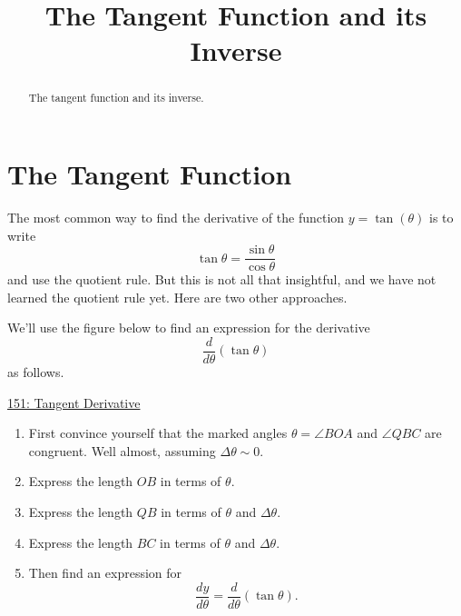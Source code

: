 \documentclass{ximera}
\title{The Tangent Function and its Inverse}
\begin{document}
\begin{abstract}
The tangent function and its inverse.
\end{abstract}
\maketitle


\section{The Tangent Function}

The most common way to find the derivative of the function $y=\tan(\theta)$ is to write 
\[
  \tan\theta = \frac{\sin\theta}{\cos \theta}
\]
and use the quotient rule. But this is not all that insightful, and we have not learned the quotient rule yet. Here are two other approaches.

\begin{question}  \label{QPDeredsRMNFR}

We'll use the figure below to find an expression for the derivative
\[
   \frac{d}{d\theta} \left( \tan\theta \right)
\]
as follows.

\begin{onlineOnly}
   \begin{center}
\end{center}
\end{onlineOnly}

\href{https://www.desmos.com/calculator/10538a93e8}{151: Tangent Derivative}  

\begin{enumerate}
\item First convince yourself that the marked angles $\theta = \angle BOA$ and $\angle QBC$ are congruent. Well almost, assuming $\Delta \theta \sim 0$.

\item Express the length $OB$ in terms of $\theta$.

\item Express the length $QB$ in terms of $\theta$ and $\Delta \theta$.

\item Express the length $BC$ in terms of $\theta$ and $\Delta \theta$.

\item Then find an expression for 
\[
   \frac{dy}{d\theta} = \frac{d}{d\theta} \left( \tan\theta \right) .
\]
\end{enumerate}
\end{question}
\end{document}
